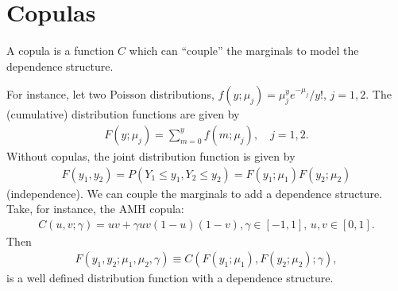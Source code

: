 \documentclass[10pt,oneside]{article}
\begin{document}
\section{Copulas}

A copula is a function $C$ which can ``couple'' the marginals to model the dependence structure.

For instance, let two Poisson distributions, $f(y;\mu_j)=\mu_j^ye^{-\mu_j}/y!$, $j=1,2$. The (cumulative) distribution functions are given by
\begin{align*}
  F(y;\mu_j)=\sum_{m=0}^y f(m;\mu_j), \quad j=1,2.
\end{align*}
Without copulas, the joint distribution function is given by
\begin{align*}
  F(y_1,y_2)=P(Y_1\le y_1,Y_2\le y_2)=F(y_1;\mu_1)F(y_2;\mu_2)
\end{align*}
(independence).
We can couple the marginals to add a dependence structure. Take, for instance, the AMH copula:
\begin{align*}
  C(u,v;\gamma)=uv+\gamma uv(1-u)(1-v), \gamma\in[-1,1], \, u,v\in[0,1].
\end{align*}
Then 
\begin{align*}
  F(y_1,y_2;\mu_1,\mu_2,\gamma)\equiv C(F(y_1;\mu_1),F(y_2;\mu_2);\gamma),
\end{align*}
is a well defined distribution function with a dependence structure.

\clearpage


\end{document}
